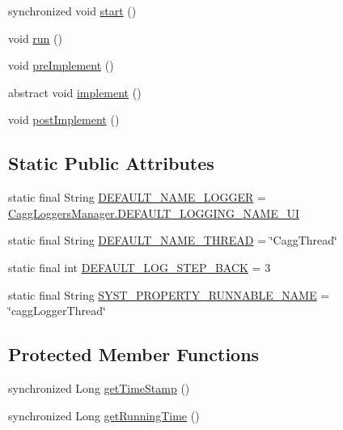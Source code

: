 \begin{DoxyCompactItemize}
\item 
synchronized void \hyperlink{classit_1_1emarolab_1_1cagg_1_1core_1_1evaluation_1_1CaggThread_adacd1299170ec06a50e2981291fb6c84}{start} ()
\item 
void \hyperlink{classit_1_1emarolab_1_1cagg_1_1core_1_1evaluation_1_1CaggThread_a5072a87b95134d4078a75e8fdae54439}{run} ()
\item 
void \hyperlink{classit_1_1emarolab_1_1cagg_1_1core_1_1evaluation_1_1CaggThread_a67f106a1089c93e3ef1cd8667d8e8408}{pre\-Implement} ()
\item 
abstract void \hyperlink{classit_1_1emarolab_1_1cagg_1_1core_1_1evaluation_1_1CaggThread_a2acaf025ba17f237c00d36cc32cc99fa}{implement} ()
\item 
void \hyperlink{classit_1_1emarolab_1_1cagg_1_1core_1_1evaluation_1_1CaggThread_a0dd3bd2fc72fc90ad5aa9f626f018d81}{post\-Implement} ()
\end{DoxyCompactItemize}
\subsection*{Static Public Attributes}
\begin{DoxyCompactItemize}
\item 
static final String \hyperlink{classit_1_1emarolab_1_1cagg_1_1core_1_1evaluation_1_1CaggThread_acd638bc1f128d58f8bc6517a94df5b87}{D\-E\-F\-A\-U\-L\-T\-\_\-\-N\-A\-M\-E\-\_\-\-L\-O\-G\-G\-E\-R} = \hyperlink{classit_1_1emarolab_1_1cagg_1_1debugging_1_1CaggLoggersManager_a3b51785eebcc2bb8567fec2a24c852f7}{Cagg\-Loggers\-Manager.\-D\-E\-F\-A\-U\-L\-T\-\_\-\-L\-O\-G\-G\-I\-N\-G\-\_\-\-N\-A\-M\-E\-\_\-\-U\-I}
\item 
static final String \hyperlink{classit_1_1emarolab_1_1cagg_1_1core_1_1evaluation_1_1CaggThread_a6cca2e13b67a575b0d66600b9659a933}{D\-E\-F\-A\-U\-L\-T\-\_\-\-N\-A\-M\-E\-\_\-\-T\-H\-R\-E\-A\-D} = \char`\"{}Cagg\-Thread\char`\"{}
\item 
static final int \hyperlink{classit_1_1emarolab_1_1cagg_1_1core_1_1evaluation_1_1CaggThread_ae39d3ab7707645e1eb216559555419f2}{D\-E\-F\-A\-U\-L\-T\-\_\-\-L\-O\-G\-\_\-\-S\-T\-E\-P\-\_\-\-B\-A\-C\-K} = 3
\item 
static final String \hyperlink{classit_1_1emarolab_1_1cagg_1_1core_1_1evaluation_1_1CaggThread_a538a6a9ae35d7beb1253b07ecc6e214a}{S\-Y\-S\-T\-\_\-\-P\-R\-O\-P\-E\-R\-T\-Y\-\_\-\-R\-U\-N\-N\-A\-B\-L\-E\-\_\-\-N\-A\-M\-E} = \char`\"{}cagg\-Logger\-Thread\char`\"{}
\end{DoxyCompactItemize}
\subsection*{Protected Member Functions}
\begin{DoxyCompactItemize}
\item 
synchronized Long \hyperlink{classit_1_1emarolab_1_1cagg_1_1core_1_1evaluation_1_1CaggThread_ab52fd5676883fa5dc775999c92057b50}{get\-Time\-Stamp} ()
\item 
synchronized Long \hyperlink{classit_1_1emarolab_1_1cagg_1_1core_1_1evaluation_1_1CaggThread_aca42df7ad8c1f2aa34fe0249d5efab4e}{get\-Running\-Time} ()
\end{DoxyCompactItemize}

